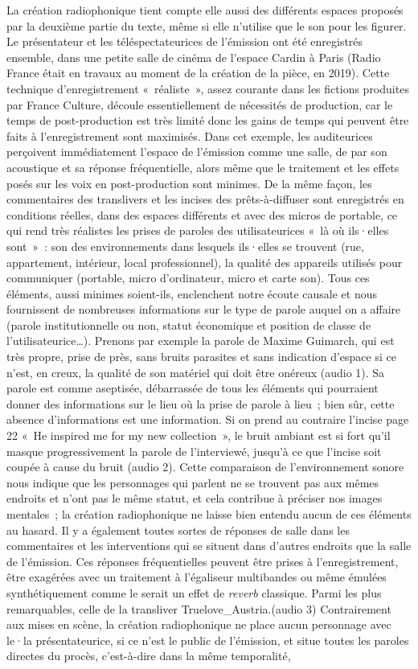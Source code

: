 \documentclass[
]{article}
\begin{document}
La création radiophonique tient compte elle aussi des différents espaces proposés par la deuxième partie du texte, même si elle n'utilise que le son pour les figurer. Le présentateur et les téléspectateurices de l'émission ont été enregistrés ensemble, dans une petite salle de cinéma de l'espace Cardin à Paris (Radio France était en travaux au moment de la création de la pièce, en 2019). Cette technique d'enregistrement «~réaliste~», assez courante dans les fictions produites par France Culture, découle essentiellement de nécessités de production, car le temps de post-production est très limité donc les gains de temps qui peuvent être faits à l'enregistrement sont maximisés. Dans cet exemple, les auditeurices perçoivent immédiatement l'espace de l'émission comme une salle, de par son acoustique et sa réponse fréquentielle, alors même que le traitement et les effets posés sur les voix en post-production sont minimes. De la même façon, les commentaires des translivers et les incises des prêts-à-diffuser sont enregistrés en conditions réelles, dans des espaces différents et avec des micros de portable, ce qui rend très réalistes les prises de paroles des utilisateurices «~là où ils·elles sont~»~: son des environnements dans lesquels ils·elles se trouvent (rue, appartement, intérieur, local professionnel), la qualité des appareils utilisés pour communiquer (portable, micro d'ordinateur, micro et carte son). Tous ces éléments, aussi minimes soient-ils, enclenchent notre écoute causale et nous fournissent de nombreuses informations sur le type de parole auquel on a affaire (parole institutionnelle ou non, statut économique et position de classe de l'utilisateurice\ldots). Prenons par exemple la parole de Maxime Guimarch, qui est très propre, prise de près, sans bruits parasites et sans indication d'espace si ce n'est, en creux, la qualité de son matériel qui doit être onéreux (audio 1). Sa parole est comme aseptisée, débarrassée de tous les éléments qui pourraient donner des informations sur le lieu où la prise de parole à lieu~; bien sûr, cette absence d'informations est une information. Si on prend au contraire l'incise page 22 «~He inspired me for my new collection~», le bruit ambiant est si fort qu'il masque progressivement la parole de l'interviewé, jusqu'à ce que l'incise soit coupée à cause du bruit (audio 2). Cette comparaison de l'environnement sonore nous indique que les personnages qui parlent ne se trouvent pas aux mêmes endroits et n'ont pas le même statut, et cela contribue à préciser nos images mentales~; la création radiophonique ne laisse bien entendu aucun de ces éléments au hasard. Il y a également toutes sortes de réponses de salle dans les commentaires et les interventions qui se situent dans d'autres endroits que la salle de l'émission. Ces réponses fréquentielles peuvent être prises à l'enregistrement, être exagérées avec un traitement à l'égaliseur multibandes ou même émulées synthétiquement comme le serait un effet de \emph{reverb} classique. Parmi les plus remarquables, celle de la transliver Truelove\_Austria.(audio 3) Contrairement aux mises en scène, la création radiophonique ne place aucun personnage avec le·la présentateurice, si ce n'est le public de l'émission, et situe toutes les paroles directes du procès, c'est-à-dire dans la même temporalité, 
\end{document}
